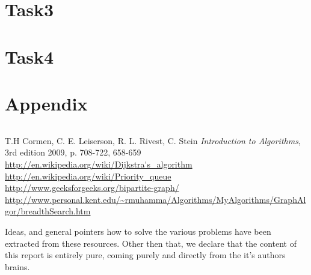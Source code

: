 \documentclass[a4paper]{article}
\begin{document}
\section{Task3}
\section{Task4}
\section{Appendix}

\begin{lstlisting}
\end{lstlisting}

\begin{thebibliography}{9}
		T.H Cormen, C. E. Leiserson, R. L. Rivest, C. Stein 	
				\textit{Introduction to Algorithms}, 3rd edition 2009, p. 708-722, 658-659 \\
		\url{http://en.wikipedia.org/wiki/Dijkstra's\_algorithm} \\
		\url{http://en.wikipedia.org/wiki/Priority\_queue} \\
		\url{http://www.geeksforgeeks.org/bipartite-graph/}
		\url{http://www.personal.kent.edu/~rmuhamma/Algorithms/MyAlgorithms/GraphAlgor/breadthSearch.htm}
\end{thebibliography}

Ideas, and general pointers how to solve the various problems have been extracted from these resources. Other then that, we declare that the content of this report is entirely pure, coming purely and directly from the it's authors brains.  
\end{document}

